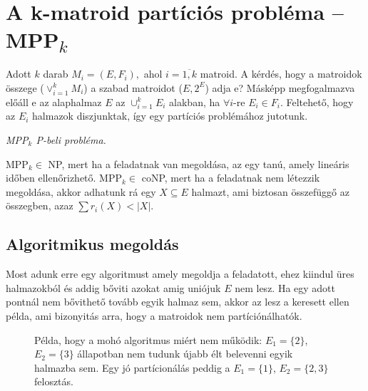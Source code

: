 \newpage
\section{\texorpdfstring{A k-matroid partíciós probléma -- MPP\textsubscript{$k$}}
		 {A k-matroid partíciós probléma}}
			 
Adott $k$ darab $M_i = (E, F_i),$ ahol $i={\overline{1,k}}$ matroid. A kérdés,
hogy a matroidok összege ($\vee_{i=1}^{k}M_i$) a szabad matroidot ($E,2^E$) adja
e? Másképp megfogalmazva előáll e az alaphalmaz $E$ az $\cup_{i=1}^{k} E_i$ alakban,
ha $\forall i$-re $E_i \in F_i$. Feltehető, hogy az $E_i$ halmazok diszjunktak, így 
egy partíciós problémához jutotunk.

\vspace{0.4cm}
\emph{MPP$_k$ P-beli probléma.}
\vspace{0.4cm}

MPP$_k \in$ NP, mert ha a feladatnak van megoldása, az egy tanú, amely lineáris időben
ellenőrizhető. MPP$_k \in$ coNP, mert ha a feladatnak nem létezzik megoldása, akkor
adhatunk rá egy $X \subseteq E$ halmazt, ami biztosan összefüggő az összegben, azaz 
$\sum r_i (X) < |X|$.



\subsection{Algoritmikus megoldás}

Most adunk erre egy algoritmust amely megoldja a feladatott, ehez kiindul üres
halmazokból és addig bőviti azokat amig uniójuk $E$ nem lesz. Ha egy adott
pontnál nem bővithető tovább egyik halmaz sem, akkor az lesz a  keresett ellen
példa, ami bizonyitás arra, hogy a matroidok nem partíciónálhatók.

\begin{figure}[htbp]
\caption{Példa, hogy a mohó algoritmus miért nem működik: 
		  $E_1 = \{2\}$, $E_2 = \{3\}$ állapotban nem tudunk újabb élt 
		  belevenni egyik halmazba sem. Egy jó partícionálás peddig a 
		  $E_1 = \{ 1 \}$, $E_2 = \{ 2, 3 \}$ felosztás.}
\label{fig:MPPMohoNem}
\centering {} 
\end{figure}

